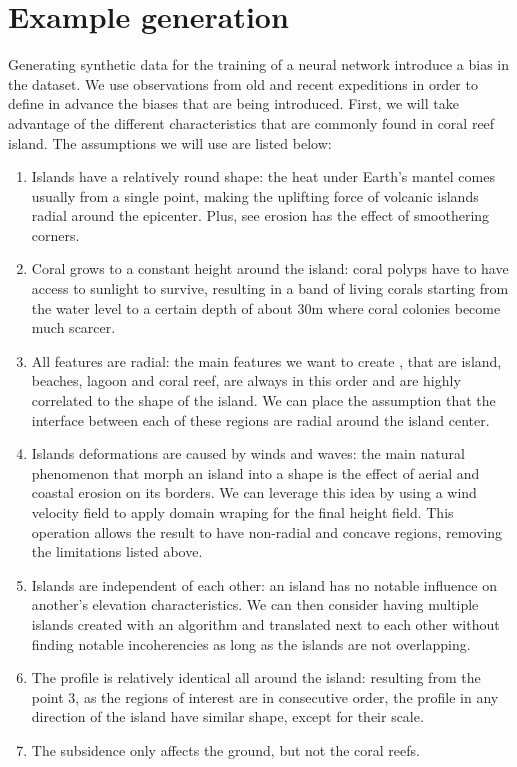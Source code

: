 \section{Example generation}
\label{sec:coral-island_example-generation}
Generating synthetic data for the training of a neural network introduce a bias in the dataset. We use observations from old and recent expeditions in order to define in advance the biases that are being introduced. First, we will take advantage of the different characteristics that are commonly found in coral reef island. The assumptions we will use are listed below:
\begin{enumerate}
    \item Islands have a relatively round shape: the heat under Earth's mantel comes usually from a single point, making the uplifting force of volcanic islands radial around the epicenter. Plus, see erosion has the effect of smoothering corners.
    \item Coral grows to a constant height around the island: coral polyps have to have access to sunlight to survive, resulting in a band of living corals starting from the water level to a certain depth of about 30m where coral colonies become much scarcer. 
    \item All features are radial: the main features we want to create , that are island, beaches, lagoon and coral reef, are always in this order and are highly correlated to the shape of the island. We can place the assumption that the interface between each of these regions are radial around the island center.
    \item Islands deformations are caused by winds and waves: the main natural phenomenon that morph an island into a shape is the effect of aerial and coastal erosion on its borders. We can leverage this idea by using a wind velocity field to apply domain wraping for the final height field. This operation allows the result to have non-radial and concave regions, removing the limitations listed above.
    \item Islands are independent of each other: an island has no notable influence on another's elevation characteristics. We can then consider having multiple islands created with an algorithm and translated next to each other without finding notable incoherencies as long as the islands are not overlapping.
    \item The profile is relatively identical all around the island: resulting from the point 3, as the regions of interest are in consecutive order, the profile in any direction of the island have similar shape, except for their scale.
    \item The subsidence only affects the ground, but not the coral reefs.
\end{enumerate}

